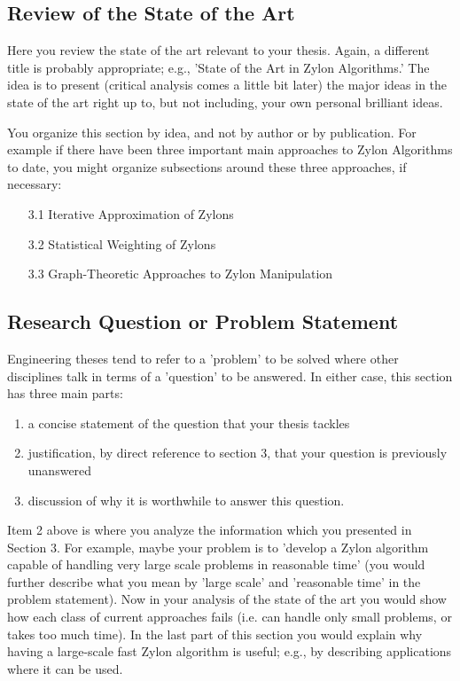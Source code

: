 \subsection{Review of the State of the Art}

Here you review the state of the art relevant to your thesis. Again, a different title is probably appropriate; e.g., 'State of the Art in Zylon Algorithms.' The idea is to present (critical analysis comes a little bit later) the major ideas in the state of the art right up to, but not including, your own personal brilliant ideas.

You organize this section by idea, and not by author or by publication. For example if there have been three important main approaches to Zylon Algorithms to date, you might organize subsections around these three approaches, if necessary:
\begin{itemize}
	\item[3.1] Iterative Approximation of Zylons
	\item[3.2] Statistical Weighting of Zylons
	\item[3.3] Graph-Theoretic Approaches to Zylon Manipulation
\end{itemize}

\subsection{Research Question or Problem Statement}

Engineering theses tend to refer to a 'problem' to be solved where other disciplines talk in terms of a 'question' to be answered. In either case, this section has three main parts:

\begin{enumerate}
	\item a concise statement of the question that your thesis tackles
	\item justification, by direct reference to section 3, that your question is previously unanswered
	\item discussion of why it is worthwhile to answer this question.
\end{enumerate}

Item 2 above is where you analyze the information which you presented in Section 3. For example, maybe your problem is to 'develop a Zylon algorithm capable of handling very large scale problems in reasonable time' (you would further describe what you mean by 'large scale' and 'reasonable time' in the problem statement). Now in your analysis of the state of the art you would show how each class of current approaches fails (i.e. can handle only small problems, or takes too much time). In the last part of this section you would explain why having a large-scale fast Zylon algorithm is useful; e.g., by describing applications where it can be used.

